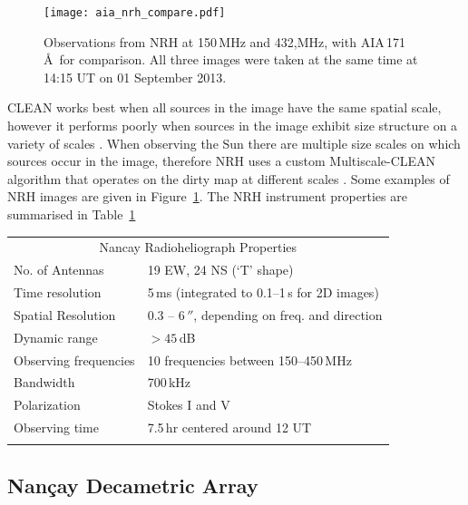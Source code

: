 \begin{figure}[!t]
\begin{center}
\texttt{[image: aia\_nrh\_compare.pdf]}
\caption[NRH observations]{Observations from NRH at 150\,MHz and 432,MHz, with AIA\,171\,\AA~for comparison. All three images were taken at the same time at 14:15 UT on 01 September 2013.}
\label{fig:nrh_obs}
\end{center}
\end{figure}
CLEAN works best when all sources in the image have the same spatial scale, however it performs poorly when sources in the image exhibit size structure on a variety of scales \citep{wakker1998}. When observing the Sun there are multiple size scales on which sources occur in the image, therefore NRH uses a custom Multiscale-CLEAN algorithm that operates on the dirty map at different scales \citep{mercier2006}. Some examples of NRH images are given in Figure~\ref{fig:nrh_obs}. The NRH instrument properties are summarised in Table~\ref{tab:nrh}

\begin{table}[!t]
  \centering
\begin{tabular}{ll}
\hline
\multicolumn{2}{c}{Nancay Radioheliograph Properties} \\
\cline{1-2}
No. of Antennas		 & 19 EW, 24 NS (`T' shape) \\
Time resolution            & 5\,ms (integrated to 0.1--1\,s for 2D images) \\
Spatial Resolution        & 0.3 -- 6\,$''$, depending on freq. and direction \\
Dynamic range   		  & $>45$\,dB \\
Observing frequencies & 10 frequencies between 150--450\,MHz \\
Bandwidth                    & 700\,kHz \\
Polarization                  & Stokes I and V \\
Observing time             & 7.5\,hr centered around 12 UT \\
\hline
\label{tab:nrh}
\end{tabular}
\end{table}




\subsection{Nan\c{c}ay Decametric Array}\label{sec:32}

